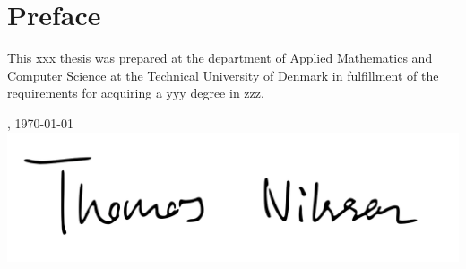 \chapter{Preface}
This xxx thesis was prepared at the department of Applied Mathematics and Computer Science at the Technical University of Denmark in fulfillment of the requirements for acquiring a yyy degree in zzz.

\vfill

{
\centering
    \thesislocation{}, \today\\[1cm]
    \hspace{3cm}\includegraphics[scale=0.4]{graphics/signature.png}\\[1cm]
\begin{flushright}
    \thesisauthor{}
\end{flushright}
}